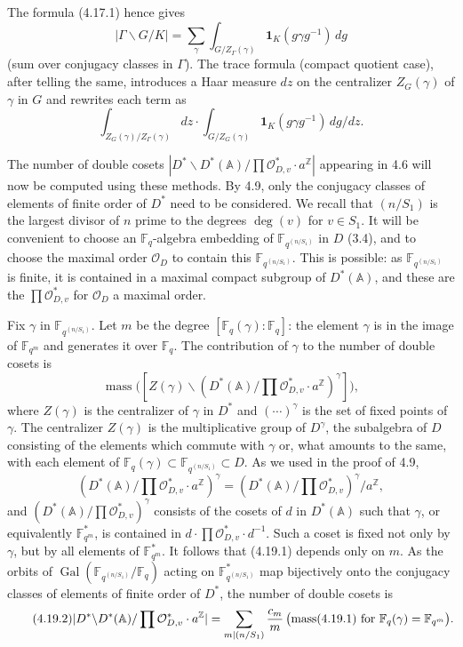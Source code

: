 \documentclass[10pt]{article}
\newcommand{\Fq}{\mathbb F_q}
\newcommand{\Fqm}{\mathbb F_{q^m}}
\newcommand{\Z}{\mathbb Z}
\newcommand{\Adele}{\mathbb A}
\newcommand{\Gal}{\operatorname{Gal}}
\newcommand{\degm}{\operatorname{deg}}
\newcommand{\mass}{\operatorname{mass}}
\newcommand{\OD}{\mathcal O_D}
\theoremstyle{deligne}
\newcommand{\heading}[1]{\vspace{0.7em}\noindent{\bfseries #1}\quad}
\begin{document}
The formula (4.17.1) hence gives
\begin{equation}\tag{4.18.2}
|\Gamma\backslash G/K|=\sum_\gamma\int_{G/Z_\Gamma(\gamma)}\mathbf 1_K(g\gamma g^{-1})\,dg
\end{equation}
(sum over conjugacy classes in $\Gamma$). The trace formula (compact quotient case), after telling the same, introduces a Haar measure $dz$ on the centralizer $Z_G(\gamma)$ of $\gamma$ in $G$ and rewrites each term as
\[
\int_{Z_G(\gamma)/Z_\Gamma(\gamma)}dz\cdot
\int_{G/Z_G(\gamma)}\mathbf 1_K(g\gamma g^{-1})\,dg/dz.
\]

\heading{4.19.} The number of double cosets $|D^*\backslash D^*(\Adele)/\prod\mathcal O_{D,v}^*\cdot a^\Z|$ appearing in 4.6 will now be computed using these methods. By 4.9, only the conjugacy classes of elements of finite order of $D^*$ need to be considered. We recall that $(n/S_1)$ is the largest divisor of $n$ prime to the degrees $\degm(v)$ for $v\in S_1$. It will be convenient to choose an $\Fq$-algebra embedding of $\mathbb F_{q^{(n/S_1)}}$ in $D$ (3.4), and to choose the maximal order $\OD$ to contain this $\mathbb F_{q^{(n/S_1)}}$. This is possible: as $\mathbb F_{q^{(n/S_1)}}$ is finite, it is contained in a maximal compact subgroup of $D^*(\Adele)$, and these are the $\prod\mathcal O_{D,v}^*$ for $\OD$ a maximal order.

Fix $\gamma$ in $\mathbb F_{q^{(n/S_1)}}$. Let $m$ be the degree $[\Fq(\gamma):\Fq]$: the element $\gamma$ is in the image of $\Fqm$ and generates it over $\Fq$. The contribution of $\gamma$ to the number of double cosets is
\begin{equation}\tag{4.19.1}
\mass\bigl([Z(\gamma)\backslash (D^*(\Adele)/\prod\mathcal O_{D,v}^*\cdot a^\Z)^\gamma]\bigr),
\end{equation}
where $Z(\gamma)$ is the centralizer of $\gamma$ in $D^*$ and $(\cdots)^\gamma$ is the set of fixed points of $\gamma$. The centralizer $Z(\gamma)$ is the multiplicative group of $D^\gamma$, the subalgebra of $D$ consisting of the elements which commute with $\gamma$ or, what amounts to the same, with each element of $\Fq(\gamma)\subset \mathbb F_{q^{(n/S_1)}}\subset D$. As we used in the proof of 4.9,
\[
(D^*(\Adele)/\prod\mathcal O_{D,v}^*\cdot a^\Z)^\gamma=(D^*(\Adele)/\prod\mathcal O_{D,v}^*)^\gamma/a^\Z,
\]
and $(D^*(\Adele)/\prod\mathcal O_{D,v}^*)^\gamma$ consists of the cosets of $d$ in $D^*(\Adele)$ such that $\gamma$, or equivalently $\Fqm^*$, is contained in $d\cdot\prod\mathcal O_{D,v}^*\cdot d^{-1}$. Such a coset is fixed not only by $\gamma$, but by all elements of $\Fqm^*$. It follows that (4.19.1) depends only on $m$. As the orbits of $\Gal(\mathbb F_{q^{(n/S_1)}}/\Fq)$ acting on $\mathbb F_{q^{(n/S_1)}}^*$ map bijectively onto the conjugacy classes of elements of finite order of $D^*$, the number of double cosets is
\begin{equation}\tag{4.19.2}
|D^*\backslash D^*(\Adele)/\prod\mathcal O_{D,v}^*\cdot a^\Z|
=\sum_{m\mid(n/S_1)}\frac{c_m}{m}\,\bigl(\mass(4.19.1)\hbox{ for }\Fq(\gamma)=\Fqm\bigr).
\end{equation}
\end{document}
